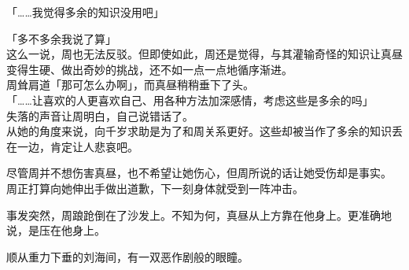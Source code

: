 「……我觉得多余的知识没用吧」

「多不多余我说了算」\\

这么一说，周也无法反驳。但即使如此，周还是觉得，与其灌输奇怪的知识让真昼变得生硬、做出奇妙的挑战，还不如一点一点地循序渐进。\\

周耸肩道「那可怎么办啊」，而真昼稍稍垂下了头。\\

「……让喜欢的人更喜欢自己、用各种方法加深感情，考虑这些是多余的吗」\\

失落的声音让周明白，自己说错话了。\\

从她的角度来说，向千岁求助是为了和周关系更好。这些却被当作了多余的知识丢在一边，肯定让人悲哀吧。

尽管周并不想伤害真昼，也不希望让她伤心，但周所说的话让她受伤却是事实。\\

周正打算向她伸出手做出道歉，下一刻身体就受到一阵冲击。

事发突然，周踉跄倒在了沙发上。不知为何，真昼从上方靠在他身上。更准确地说，是压在他身上。

顺从重力下垂的刘海间，有一双恶作剧般的眼瞳。\\

